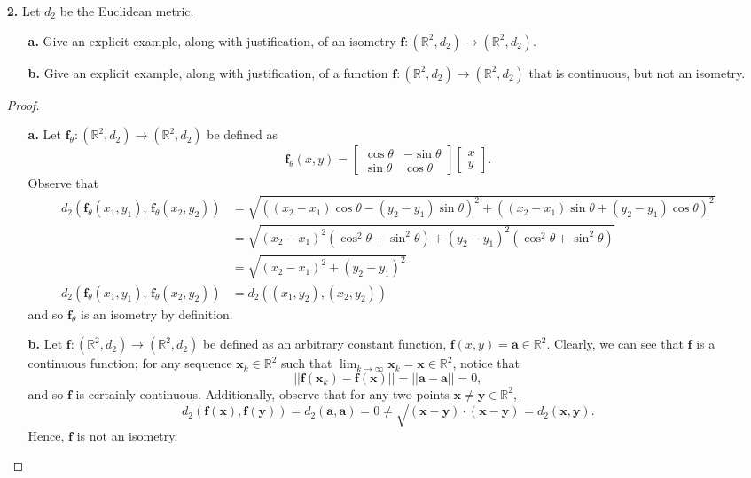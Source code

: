 \documentclass[ 12pt ]{article}
\begin{document}
\begin{enumerate}
	\item[\textbf{2.}] Let $d_2$ be the Euclidean metric.
		\begin{enumerate}
			\item[\textbf{a.}] Give an explicit example, along with justification, of an isometry $\textbf{f} : (\mathbb{R}^2, d_2) \to (\mathbb{R}^2, d_2)$.
			\item[\textbf{b.}] Give an explicit example, along with justification, of a function $\textbf{f} : (\mathbb{R}^2, d_2) \to (\mathbb{R}^2, d_2)$ that is continuous, but not
				an isometry.
		\end{enumerate}

		\begin{proof} $ $
			\begin{enumerate}
				\item[\textbf{a.}] Let $\textbf{f}_\theta : (\mathbb{R}^2, d_2) \to (\mathbb{R}^2, d_2)$ be defined as $$\textbf{f}_\theta(x, y) = \begin{bmatrix} \cos \theta & -\sin
					\theta \\ \sin \theta & \cos \theta \end{bmatrix} \begin{bmatrix} x \\ y \end{bmatrix}.$$ Observe that
					\begin{align*}
						d_2( \textbf{f}_\theta(x_1, y_1),\, \textbf{f}_\theta(x_2, y_2) ) &= \sqrt{ \left ( (x_2 - x_1)\cos \theta - (y_2 - y_1)\sin \theta \right )^2 + \left ((x_2 - 
							x_1)\sin \theta + (y_2 - y_1)\cos \theta \right )^2 } \\
						&= \sqrt{ (x_2 - x_1)^2( \cos^2 \theta + \sin^2 \theta ) + (y_2 - y_1)^2(\cos^2 \theta + \sin^2 \theta ) } \\
						&= \sqrt{ (x_2 - x_1)^2 + (y_2 - y_1)^2 } \\
						d_2( \textbf{f}_\theta(x_1, y_1),\, \textbf{f}_\theta(x_2, y_2) ) &= d_2( (x_1, y_2), (x_2, y_2) )
					\end{align*}
					and so $\textbf{f}_\theta$ is an isometry by definition.

				\item[\textbf{b.}] Let $\textbf{f} : (\mathbb{R}^2, d_2) \to (\mathbb{R}^2, d_2)$ be defined as an arbitrary constant function, $\textbf{f}(x, y) = \textbf{a} \in
					\mathbb{R}^2$. Clearly, we can see that $\textbf{f}$ is a continuous function; for any sequence $\textbf{x}_k \in \mathbb{R}^2$ such that $\lim_{k
					\to \infty} \textbf{x}_k = \textbf{x} \in \mathbb{R}^2$, notice that $$||\textbf{f}(\textbf{x}_k) - \textbf{f}(\textbf{x})|| = ||\textbf{a} - \textbf{a}|| = 0,$$
					and so $\textbf{f}$ is certainly continuous. Additionally, observe that for any two points $\textbf{x} \neq \textbf{y} \in \mathbb{R}^2$, $$d_2( \textbf{f}(
					\textbf{x}), \textbf{f}(\textbf{y}) ) = d_2( \textbf{a}, \textbf{a} ) = 0 \neq \sqrt{(\textbf{x} - \textbf{y}) \cdot (\textbf{x} - \textbf{y})} = d_2(\textbf{x},
					\textbf{y}).$$ Hence, $\textbf{f}$ is not an isometry.
			\end{enumerate}
		\end{proof}



\end{enumerate}
\end{document}
